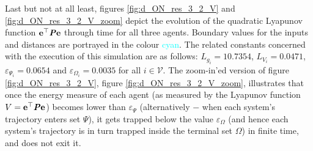 Last but not at all least, figures
\eqref{fig:d_ON_res_3_2_V} and \eqref{fig:d_ON_res_3_2_V_zoom} depict
the evolution of the quadratic Lyapunov function
$\bm{\mathbf{e}}^{\top} \bm{\mathit{P}} \bm{\mathbf{e}}$ through time for all three agents.
Boundary values for the inputs and distances are portrayed in the colour
\textcolor{cyan}{cyan}. The related constants concerned with the execution
of this simulation are as follows: $L_{g_i} = 10.7354$, $L_{V_i} = 0.0471$,
$\varepsilon_{\Psi_i} = 0.0654$ and $\varepsilon_{\Omega_i} = 0.0035$ for
all $i \in \mathcal{V}$. The zoom-in'ed version of figure
\eqref{fig:d_ON_res_3_2_V}, figure \eqref{fig:d_ON_res_3_2_V_zoom},
illustrates that once the energy measure of each agent (as measured by
the Lyapunov function $V = \bm{\mathbf{e}}^{\top} \bm{\mathit{P}} \bm{\mathbf{e}}$) becomes lower than
$\varepsilon_{\Psi}$ (alternatively $-$ when each system's trajectory enters
set $\Psi$), it gets trapped below the value $\varepsilon_{\Omega}$ (and
hence each system's trajectory is in turn trapped inside the terminal
set $\Omega$) in finite time, and does not exit it.


\noindent{}


